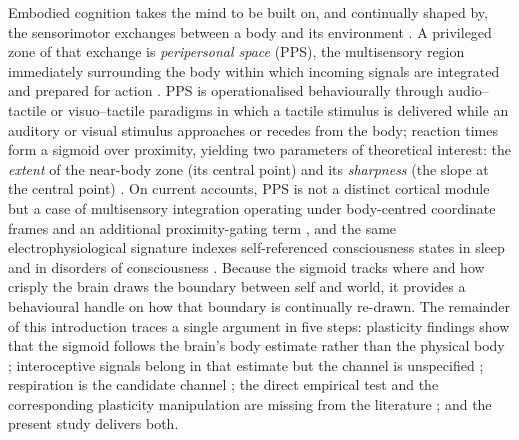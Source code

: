 Embodied cognition takes the mind to be built on, and continually shaped by, the sensorimotor exchanges between a body and its environment \citep{Glenberg2010, Barsalou2008, barsalou2008grounded}. A privileged zone of that exchange is \emph{peripersonal space} (PPS), the multisensory region immediately surrounding the body within which incoming signals are integrated and prepared for action \citep{rizzolatti1997space, diPellegrino2015, Serino2019, noel_2021}. PPS is operationalised behaviourally through audio--tactile or visuo--tactile paradigms in which a tactile stimulus is delivered while an auditory or visual stimulus approaches or recedes from the body; reaction times form a sigmoid over proximity, yielding two parameters of theoretical interest: the \emph{extent} of the near-body zone (its central point) and its \emph{sharpness} (the slope at the central point) \citep{Canzoneri2012, teneggi2013social, Bufacchi2018, Basile2024}. On current accounts, PPS is not a distinct cortical module but a case of multisensory integration operating under body-centred coordinate frames and an additional proximity-gating term \citep{noel_2018, bertoni_2025, straka_2022}, and the same electrophysiological signature indexes self-referenced consciousness states in sleep and in disorders of consciousness \citep{bertoni_2026}. Because the sigmoid tracks where and how crisply the brain draws the boundary between self and world, it provides a behavioural handle on how that boundary is continually re-drawn. The remainder of this introduction traces a single argument in five steps: plasticity findings show that the sigmoid follows the brain's body estimate rather than the physical body \citep{noel_2021, Serino2019}; interoceptive signals belong in that estimate but the channel is unspecified \citep{Ardizzi2018, salvato_2020, bogdanova_2021}; respiration is the candidate channel \citep{saltafossi_2025, allen_2021}; the direct empirical test and the corresponding plasticity manipulation are missing from the literature \citep{spaccasassi_2019, karakoc_2025}; and the present study delivers both.

